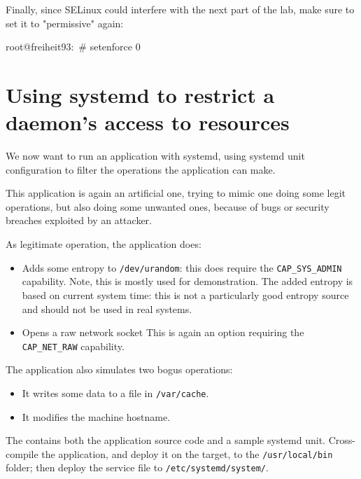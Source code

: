 Finally, since SELinux could interfere with the next part of the lab, make sure
to set it to "permissive" again:

\begin{bashinput}
root@freiheit93:~# setenforce 0
\end{bashinput}

\section{Using systemd to restrict a daemon's access to resources}

We now want to run an application with systemd, using systemd unit configuration
to filter the operations the application can make.

This application is again an artificial one, trying to mimic one doing some legit
operations, but also doing some unwanted ones, because of bugs or security
breaches exploited by an attacker.

As legitimate operation, the application does:
\begin{itemize}
  \item Adds some entropy to \texttt{/dev/urandom}: this does require the
    \texttt{CAP\_SYS\_ADMIN} capability.
    Note, this is mostly used for demonstration.
    The added entropy is based on current system time: this is not a
    particularly good entropy source and should not be used in real systems.
  \item Opens a raw network socket
    This is again an option requiring the \texttt{CAP\_NET\_RAW} capability.
\end{itemize}

The application also simulates two bogus operations:
\begin{itemize}
	\item It writes some data to a file in \texttt{/var/cache}.
	\item It modifies the machine hostname.
\end{itemize}

The  contains both the
application source code and a sample systemd unit.
Cross-compile the application, and deploy it on the target, to the
\texttt{/usr/local/bin} folder; then deploy the service file to
\texttt{/etc/systemd/system/}.



